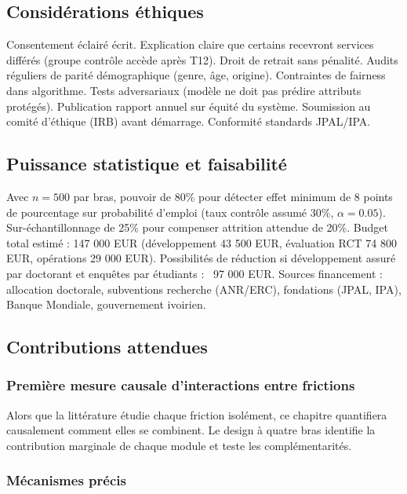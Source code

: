 \documentclass[12pt,a4paper]{article}
\begin{document}
\subsection{Considérations éthiques}

Consentement éclairé écrit. Explication claire que certains recevront services différés (groupe contrôle accède après T12). Droit de retrait sans pénalité. Audits réguliers de parité démographique (genre, âge, origine). Contraintes de fairness dans algorithme. Tests adversariaux (modèle ne doit pas prédire attributs protégés). Publication rapport annuel sur équité du système. Soumission au comité d'éthique (IRB) avant démarrage. Conformité standards JPAL/IPA.

\subsection{Puissance statistique et faisabilité}

Avec $n=500$ par bras, pouvoir de 80\% pour détecter effet minimum de 8 points de pourcentage sur probabilité d'emploi (taux contrôle assumé 30\%, $\alpha=0.05$). Sur-échantillonnage de 25\% pour compenser attrition attendue de 20\%. Budget total estimé : 147 000 EUR (développement 43 500 EUR, évaluation RCT 74 800 EUR, opérations 29 000 EUR). Possibilités de réduction si développement assuré par doctorant et enquêtes par étudiants : ~97 000 EUR. Sources financement : allocation doctorale, subventions recherche (ANR/ERC), fondations (JPAL, IPA), Banque Mondiale, gouvernement ivoirien.

\subsection{Contributions attendues}

\subsubsection{Première mesure causale d'interactions entre frictions}

Alors que la littérature étudie chaque friction isolément, ce chapitre quantifiera causalement comment elles se combinent. Le design à quatre bras identifie la contribution marginale de chaque module et teste les complémentarités.

\subsubsection{Mécanismes précis}
\end{document}
